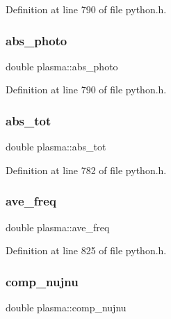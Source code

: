 Definition at line 790 of file python.\+h.

\mbox{\label{structplasma_ab5ee24fc4d7c3533aafdde5591bdc0c4}} 
\subsubsection{\texorpdfstring{abs\+\_\+photo}{abs\_photo}}
{\footnotesize\ttfamily double plasma\+::abs\+\_\+photo}



Definition at line 790 of file python.\+h.

\mbox{\label{structplasma_a671e4d660694e4fef07580536f729bfb}} 
\subsubsection{\texorpdfstring{abs\+\_\+tot}{abs\_tot}}
{\footnotesize\ttfamily double plasma\+::abs\+\_\+tot}



Definition at line 782 of file python.\+h.

\mbox{\label{structplasma_a9ef4bb2909c072cb6155880d3114c95f}} 
\subsubsection{\texorpdfstring{ave\+\_\+freq}{ave\_freq}}
{\footnotesize\ttfamily double plasma\+::ave\+\_\+freq}



Definition at line 825 of file python.\+h.

\mbox{\label{structplasma_a57a290ba7730852666e194dcd1d594e6}} 
\subsubsection{\texorpdfstring{comp\+\_\+nujnu}{comp\_nujnu}}
{\footnotesize\ttfamily double plasma\+::comp\+\_\+nujnu}



